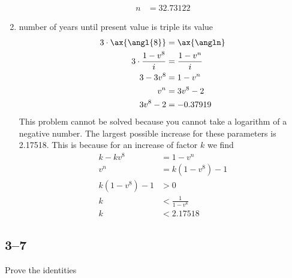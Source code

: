 \documentclass[a4paper, 12pt, reqno]{amsart}
\numberwithin{equation}{section}
\begin{document}
\begin{enumerate}[label=(\alph*)]
\begin{equation}
\begin{aligned}
                n &= 32.73122
            \end{aligned}
        \end{equation}
    \item number of years until present value is triple its value
        \begin{equation}\nonumber
            \begin{aligned}
                3 \cdot \ax{\angl{8}} &= \ax{\angln}            \\
                3 \cdot \frac{1 - v^8}{i} &= \frac{1-v^n}{i}    \\
                3 - 3v^8 &= 1 - v^n                             \\
                v^n &= 3v^8 - 2                                 \\
                3v^8 - 2 &= -0.37919
            \end{aligned}
        \end{equation}
        This problem cannot be solved because you cannot take a logarithm of
        a negative number. The largest possible increase for these parameters
        is 2.17518. This is because for an increase of factor $k$ we find
        \begin{equation}\nonumber
            \begin{aligned}
                k - kv^8 &= 1 - v^n     \\
                v^n &= k(1-v^8) - 1     \\
                k(1-v^8) - 1 &> 0       \\
                k &< \frac{1}{1-v^8}    \\
                k &< 2.17518
            \end{aligned}
        \end{equation}
\end{enumerate}

\subsection*{3--7}

Prove the identities
\end{document}
